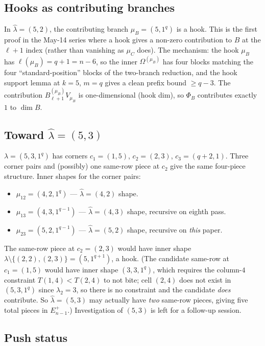 \documentclass[11pt]{article}
\theoremstyle{definition}
\newcommand{\Om}{\Omega}
\newcommand{\hatl}{\widehat\lambda}
\begin{document}
\subsection{Hooks as contributing branches}

In $\hatl = (5, 2)$, the contributing branch $\mu_B = (5, 1^q)$ is a
hook.  This is the first proof in the May-14 series where a hook gives
a non-zero contribution to $B$ at the $\ell + 1$ index (rather than
vanishing as $\mu_C$ does).  The mechanism: the hook $\mu_B$ has
$\ell(\mu_B) = q + 1 = n - 6$, so the inner $\Om^{(\mu_B)}$ has four
blocks matching the four ``standard-position'' blocks of the
two-branch reduction, and the hook support lemma at $k = 5$, $m = q$
gives a clean prefix bound $\ge q - 3$.  The contribution
$B^{(\mu_B)}_{\ell+1} V_{\mu_B}$ is one-dimensional (hook dim), so
$\Phi_B$ contributes exactly $1$ to $\dim B$.

\subsection{Toward $\hatl = (5, 3)$}

$\lambda = (5, 3, 1^q)$ has corners $c_1 = (1, 5)$, $c_2 = (2, 3)$,
$c_3 = (q + 2, 1)$.  Three corner pairs and (possibly) one same-row
piece at $c_2$ give the same four-piece structure.  Inner shapes for
the corner pairs:
\begin{itemize}[topsep=0.2em,itemsep=0.1em]
\item $\mu_{12} = (4, 2, 1^q)$ --- $\hatl = (4, 2)$ shape.
\item $\mu_{13} = (4, 3, 1^{q-1})$ --- $\hatl = (4, 3)$ shape, recursive
   on eighth pass.
\item $\mu_{23} = (5, 2, 1^{q-1})$ --- $\hatl = (5, 2)$ shape, recursive
   on \emph{this} paper.
\end{itemize}
The same-row piece at $c_2 = (2, 3)$ would have inner shape
$\lambda \setminus \{(2, 2), (2, 3)\} = (5, 1^{q+1})$, a hook.  (The
candidate same-row at $c_1 = (1, 5)$ would have inner shape $(3, 3,
1^q)$, which requires the column-$4$ constraint $T(1, 4) < T(2, 4)$ to
not bite; cell $(2, 4)$ does not exist in $(5, 3, 1^q)$ since
$\lambda_2 = 3$, so there is no constraint and the candidate
\emph{does} contribute.  So $\hatl = (5, 3)$ may actually have
\emph{two} same-row pieces, giving five total pieces in
$E^+_{n-1}$.)  Investigation of $(5, 3)$ is left for a follow-up
session.

\subsection{Push status}
\end{document}
